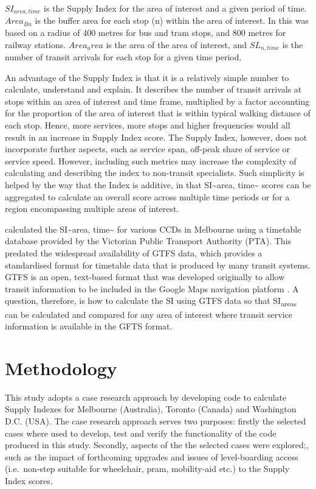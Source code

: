 \documentclass[]{tufte-book}
\begin{document}
\(SI_{area, time}\) is the Supply Index for the area of interest and a
given period of time. \(Area_{Bn}\) is the buffer area for each stop (n)
within the area of interest. In \citet{currie2007identifying} this was
based on a radius of 400 metres for bus and tram stops, and 800 metres
for railway stations. \(Area_area\) is the area of the area of interest,
and \(SL_{n,time}\) is the number of transit arrivals for each stop for
a given time period.

An advantage of the Supply Index is that it is a relatively simple
number to calculate, understand and explain. It describes the number of
transit arrivals at stops within an area of interest and time frame,
multiplied by a factor accounting for the proportion of the area of
interest that is within typical walking distance of each stop. Hence,
more services, more stops and higher frequencies would all result in an
increase in Supply Index score. The Supply Index, however, does not
incorporate further aspects, such as service span, off-peak share of
service or service speed. However, including such metrics may increase
the complexity of calculating and describing the index to non-transit
specialists. Such simplicity is helped by the way that the Index is
additive, in that SI\textasciitilde area, time\textasciitilde{} scores
can be aggregated to calculate an overall score across multiple time
periods or for a region encompassing multiple areas of interest.

\citet{currie2007identifying} calculated the SI\textasciitilde area,
time\textasciitilde{} for various CCDs in Melbourne using a timetable
database provided by the Victorian Public Transport Authority (PTA).
This predated the widespread availability of GTFS data, which provides a
standardised format for timetable data that is produced by many transit
systems. GTFS is an open, text-based format that was developed
originally to allow transit information to be included in the Google
Maps navigation platform \citep{GTFS}. A question, therefore, is how to
calculate the SI using GTFS data so that SI\textsubscript{areas} can be
calculated and compared for any area of interest where transit service
information is available in the GFTS format.

\hypertarget{methodology}{%
\chapter{Methodology}\label{methodology}}

This study adopts a case research approach by developing code to
calculate Supply Indexes for Melbourne (Australia), Toronto (Canada) and
Washington D.C. (USA). The case research approach serves two purposes:
firstly the selected cases where used to develop, test and verify the
functionality of the code produced in this study. Secondly, aspects of
the the selected cases were explored;, such as the impact of forthcoming
upgrades and issues of level-boarding access (i.e.~non-step suitable for
wheelchair, pram, mobility-aid etc.) to the Supply Index scores.
\end{document}
